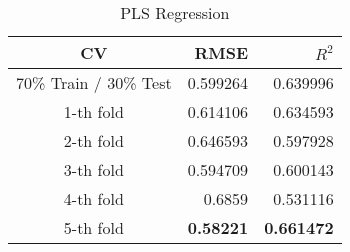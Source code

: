 \begin{table}
\centering
  \caption{PLS Regression}
  \begin{tabular}{crr}
    \toprule
    {CV} & {RMSE} & {$R^2$} \\\hline
    70\% Train / 30\% Test & 0.599264 & 0.639996 \\
    1-th fold & 0.614106 & 0.634593 \\
    2-th fold & 0.646593 & 0.597928 \\
    3-th fold & 0.594709 & 0.600143 \\
    4-th fold & 0.6859 & 0.531116 \\
    5-th fold & \textbf{0.58221} & \textbf{0.661472} \\\bottomrule
  \end{tabular}
\end{table}
